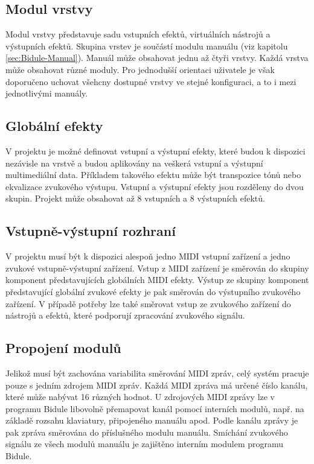 \documentclass[thesis=M,czech]{FITthesis}[2019/03/06]
\begin{document}
	\subsection{Modul vrstvy}\label{sec:Bidule-Layer}
	Modul vrstvy představuje sadu vstupních efektů, virtuálních nástrojů a výstupních efektů.
	Skupina vrstev je součástí modulu manuálu (viz kapitolu \ref{sec:Bidule-Manual}).
	Manuál může obsahovat jednu až čtyři vrstvy.
	Každá vrstva může obsahovat různé moduly. Pro jednodušší orientaci uživatele je však doporučeno
	uchovat všehcny dostupné vrstvy ve stejné konfiguraci, a to i mezi jednotlivými manuály.
	
	\subsection{Globální efekty}
	V projektu je možné definovat vstupní a výstupní efekty, které budou k dispozici nezávisle na vrstvě
	a budou aplikovány na veškerá vstupní a výstupní multimediální data. Příkladem takového efektu může být
	transpozice tónů nebo ekvalizace zvukového výstupu. Vstupní a výstupní efekty jsou rozděleny do dvou skupin.
	Projekt může obsahovat až 8 vstupních a 8 výstupních efektů.
	
	\subsection{Vstupně-výstupní rozhraní}
	V projektu musí být k dispozici alespoň jedno MIDI vstupní zařízení a jedno zvukové vstupně-výstupní zařízení.
	Vstup z MIDI zařízení je směrován do skupiny komponent představujících globálních MIDI efekty.
	Výstup ze skupiny komponent představující globální zvukové efekty je pak směrován do výstupního zvukového zařízení.
	V případě potřeby lze také směrovat vstup ze zvukového zařízení do nástrojů a efektů, které podporují zpracování
	zvukového signálu.
	
	\subsection{Propojení modulů}
	Jelikož musí být zachována variabilita směrování MIDI zpráv, celý systém pracuje pouze s jedním zdrojem MIDI zpráv.
	Každá MIDI zpráva má určené číslo kanálu, které může nabývat 16 různých hodnot.
	U zdrojových MIDI zprávy lze v programu Bidule libovolně přemapovat kanál pomocí interních modulů, např. na základě rozsahu klaviatury, připojeného manuálu apod.
	Podle kanálu zprávy je pak zpráva směrována do příslušného modulu manuálu. Smíchání zvukového signálu ze všech modulů manuálu je zajištěno interním modulem programu Bidule.
	
\end{document}
